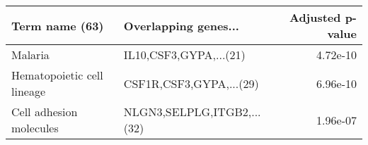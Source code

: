 \begin{tabular}{llr}
\toprule
            Term name (63) &       Overlapping genes... &  Adjusted p-value \\
\midrule
                   Malaria &     IL10,CSF3,GYPA,...(21) &          4.72e-10 \\
Hematopoietic cell lineage &    CSF1R,CSF3,GYPA,...(29) &          6.96e-10 \\
   Cell adhesion molecules & NLGN3,SELPLG,ITGB2,...(32) &          1.96e-07 \\
\bottomrule
\end{tabular}
